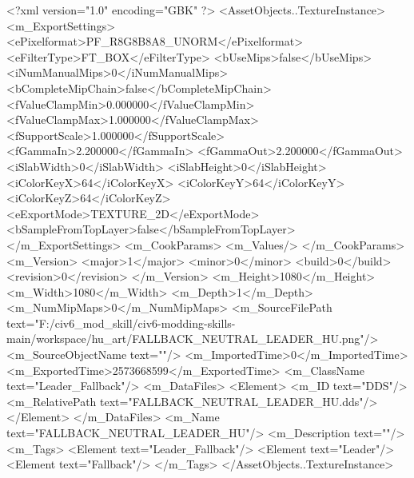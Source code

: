 <?xml version="1.0" encoding="GBK" ?>
<AssetObjects..TextureInstance>
	<m_ExportSettings>
		<ePixelformat>PF_R8G8B8A8_UNORM</ePixelformat>
		<eFilterType>FT_BOX</eFilterType>
		<bUseMips>false</bUseMips>
		<iNumManualMips>0</iNumManualMips>
		<bCompleteMipChain>false</bCompleteMipChain>
		<fValueClampMin>0.000000</fValueClampMin>
		<fValueClampMax>1.000000</fValueClampMax>
		<fSupportScale>1.000000</fSupportScale>
		<fGammaIn>2.200000</fGammaIn>
		<fGammaOut>2.200000</fGammaOut>
		<iSlabWidth>0</iSlabWidth>
		<iSlabHeight>0</iSlabHeight>
		<iColorKeyX>64</iColorKeyX>
		<iColorKeyY>64</iColorKeyY>
		<iColorKeyZ>64</iColorKeyZ>
		<eExportMode>TEXTURE_2D</eExportMode>
		<bSampleFromTopLayer>false</bSampleFromTopLayer>
	</m_ExportSettings>
	<m_CookParams>
		<m_Values/>
	</m_CookParams>
	<m_Version>
		<major>1</major>
		<minor>0</minor>
		<build>0</build>
		<revision>0</revision>
	</m_Version>
	<m_Height>1080</m_Height>
	<m_Width>1080</m_Width>
	<m_Depth>1</m_Depth>
	<m_NumMipMaps>0</m_NumMipMaps>
	<m_SourceFilePath text="F:/civ6_mod_skill/civ6-modding-skills-main/workspace/hu_art/FALLBACK_NEUTRAL_LEADER_HU.png"/>
	<m_SourceObjectName text=""/>
	<m_ImportedTime>0</m_ImportedTime>
	<m_ExportedTime>2573668599</m_ExportedTime>
	<m_ClassName text="Leader_Fallback"/>
	<m_DataFiles>
		<Element>
			<m_ID text="DDS"/>
			<m_RelativePath text="FALLBACK_NEUTRAL_LEADER_HU.dds"/>
		</Element>
	</m_DataFiles>
	<m_Name text="FALLBACK_NEUTRAL_LEADER_HU"/>
	<m_Description text=""/>
	<m_Tags>
		<Element text="Leader_Fallback"/>
		<Element text="Leader"/>
		<Element text="Fallback"/>
	</m_Tags>
</AssetObjects..TextureInstance>
